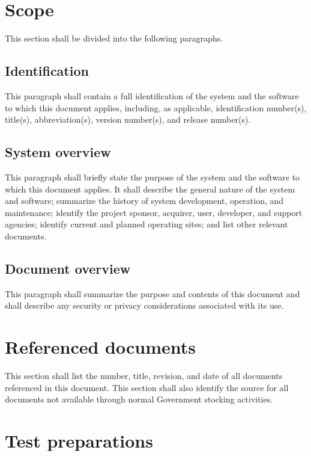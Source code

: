 \documentclass{fidata-report-template}
\begin{document}
\section{Scope}

This section shall be divided into the following paragraphs.

\subsection{Identification}

This paragraph shall contain a full identification of the system and the
software to which this document applies, including, as applicable,
identification number(s), title(s), abbreviation(s), version number(s),
and release number(s).

\subsection{System overview}

This paragraph shall briefly state the purpose of the system and the
software to which this document applies. It shall describe the general
nature of the system and software; summarize the history of system
development, operation, and maintenance; identify the project sponsor,
acquirer, user, developer, and support agencies; identify current and
planned operating sites; and list other relevant documents.

\subsection{Document overview}

This paragraph shall summarize the purpose and contents of this document
and shall describe any security or privacy considerations associated
with its use.

\section{Referenced documents}

This section shall list the number, title, revision, and date of all
documents referenced in this document. This section shall also identify
the source for all documents not available through normal Government
stocking activities.

\section{Test preparations}
\end{document}
